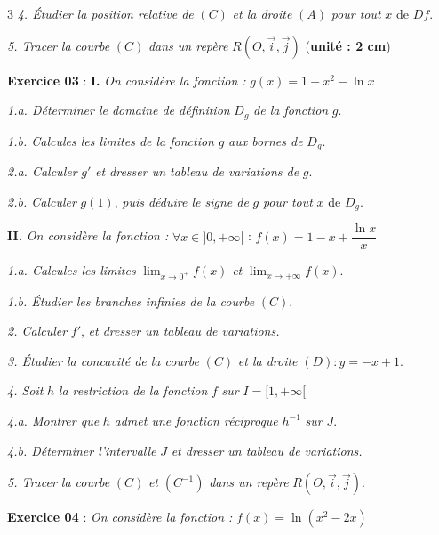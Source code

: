 \documentclass[a4paper,landscape]{article}
\begin{document}
\begin{multicols}{3}
\textit{4. Étudier la position relative de} $(C)$ \textit{et la droite} $(A)$ \textit{pour tout} $x$ de $Df$.

\textit{5. Tracer la courbe} $(C)$ \textit{dans un repère} $R(O,\vec{i},\vec{j})$ (\textbf{unité : 2 cm})

\vspace{2mm}
\noindent\colorbox{vert}{\textbf{Exercice 03}} : \textbf{I.} \textit{On considère la fonction :} $g(x) = 1 - x^2 - \ln x$

\vspace{1mm}

\textit{1.a. Déterminer le domaine de définition} $D_g$ \textit{de la fonction} $g$.

\textit{1.b. Calcules les limites de la fonction} $g$ \textit{aux bornes de} $D_g$.

\textit{2.a. Calculer} $g'$ \textit{et dresser un tableau de variations de} $g$.

\textit{2.b. Calculer} $g(1)$, \textit{puis déduire le signe de} $g$ \textit{pour tout} $x$ de $D_g$.

\vspace{1mm}
\textbf{II.} \textit{On considère la fonction :} $\forall x \in ]0,+\infty[$ : $f(x) = 1 - x + \dfrac{\ln x}{x}$

\vspace{1mm}

\textit{1.a. Calcules les limites} $\displaystyle\lim_{x \to 0^+} f(x)$ \textit{et} $\displaystyle\lim_{x \to +\infty} f(x)$.

\textit{1.b. Étudier les branches infinies de la courbe} $(C)$.

\textit{2. Calculer} $f'$, \textit{et dresser un tableau de variations.}

\textit{3. Étudier la concavité de la courbe} $(C)$ \textit{et la droite} $(D) : y = -x + 1$.

\textit{4. Soit} $h$ \textit{la restriction de la fonction} $f$ \textit{sur} $I = [1, +\infty[$

\textit{4.a. Montrer que} $h$ \textit{admet une fonction réciproque} $h^{-1}$ \textit{sur} $J$.

\textit{4.b. Déterminer l'intervalle} $J$ \textit{et dresser un tableau de variations.}

\textit{5. Tracer la courbe} $(C)$ \textit{et} $(C^{-1})$ \textit{dans un repère} $R(O,\vec{i},\vec{j})$.

\vspace{2mm}
\noindent\colorbox{vert}{\textbf{Exercice 04}} : \textit{On considère la fonction :} $f(x) = \ln(x^2 - 2x)$


\end{multicols}
\end{document}
